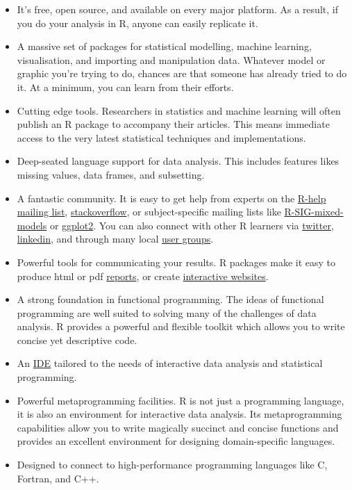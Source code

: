 \begin{itemize}
\item
  It's free, open source, and available on every major platform. As a
  result, if you do your analysis in R, anyone can easily replicate it.
\item
  A massive set of packages for statistical modelling, machine learning,
  visualisation, and importing and manipulation data. Whatever model or
  graphic you're trying to do, chances are that someone has already
  tried to do it. At a minimum, you can learn from their efforts.
\item
  Cutting edge tools. Researchers in statistics and machine learning
  will often publish an R package to accompany their articles. This
  means immediate access to the very latest statistical techniques and
  implementations.
\item
  Deep-seated language support for data analysis. This includes features
  likes missing values, data frames, and subsetting.
\item
  A fantastic community. It is easy to get help from experts on the
  \href{https://stat.ethz.ch/mailman/listinfo/r-help}{R-help mailing
  list},
  \href{http://stackoverflow.com/questions/tagged/r}{stackoverflow}, or
  subject-specific mailing lists like
  \href{https://stat.ethz.ch/mailman/listinfo/r-sig-mixed-models}{R-SIG-mixed-models}
  or \href{https://groups.google.com/forum/\#!forum/ggplot2}{ggplot2}.
  You can also connect with other R learners via
  \href{https://twitter.com/search?q=\%23rstats}{twitter},
  \href{http://www.linkedin.com/groups/R-Project-Statistical-Computing-77616}{linkedin},
  and through many local
  \href{http://blog.revolutionanalytics.com/local-r-groups.html}{user
  groups}.
\item
  Powerful tools for communicating your results. R packages make it easy
  to produce html or pdf \href{http://yihui.name/knitr/}{reports}, or
  create \href{http://www.rstudio.com/shiny/}{interactive websites}.
\item
  A strong foundation in functional programming. The ideas of functional
  programming are well suited to solving many of the challenges of data
  analysis. R provides a powerful and flexible toolkit which allows you
  to write concise yet descriptive code.
\item
  An \href{http://www.rstudio.com/ide/}{IDE} tailored to the needs of
  interactive data analysis and statistical programming.
\item
  Powerful metaprogramming facilities. R is not just a programming
  language, it is also an environment for interactive data analysis. Its
  metaprogramming capabilities allow you to write magically succinct and
  concise functions and provides an excellent environment for designing
  domain-specific languages.
\item
  Designed to connect to high-performance programming languages like C,
  Fortran, and C++.
\end{itemize}

